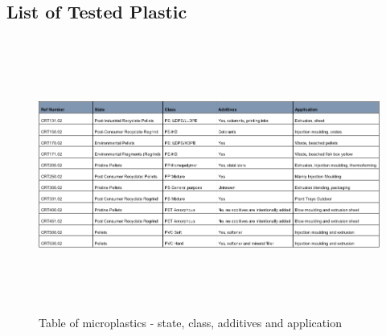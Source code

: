 \begin{appendices}
\chapter{List of Tested Plastic}
\label{app:list_plast}

\begin{figure}
    \centering
    \includegraphics[height = 9cm, angle = 90]{Images/order.png}
    \caption[Table of Microplastics]{Table of microplastics - state, class, additives and application}
    \label{fig:order}
\end{figure}


\end{appendices}
